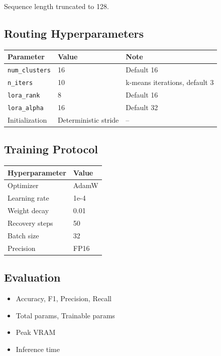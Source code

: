 Sequence length truncated to 128.

\subsection{Routing Hyperparameters}

\begin{table}[H]
\centering
\small
\begin{tabular}{lll}
\toprule
\textbf{Parameter} & \textbf{Value} & \textbf{Note} \\
\midrule
\texttt{num\_clusters} & 16 & Default 16 \\
\texttt{n\_iters} & 10 & k-means iterations, default 3 \\
\texttt{lora\_rank} & 8 & Default 16 \\
\texttt{lora\_alpha} & 16 & Default 32 \\
Initialization & Deterministic stride & -- \\
\bottomrule
\end{tabular}
\end{table}

\subsection{Training Protocol}

\begin{table}[H]
\centering
\small
\begin{tabular}{ll}
\toprule
\textbf{Hyperparameter} & \textbf{Value} \\
\midrule
Optimizer & AdamW \\
Learning rate & 1e-4 \\
Weight decay & 0.01 \\
Recovery steps & 50 \\
Batch size & 32 \\
Precision & FP16 \\
\bottomrule
\end{tabular}
\end{table}

\subsection{Evaluation}

\begin{itemize}
\item Accuracy, F1, Precision, Recall
\item Total params, Trainable params
\item Peak VRAM
\item Inference time

\end{itemize}
